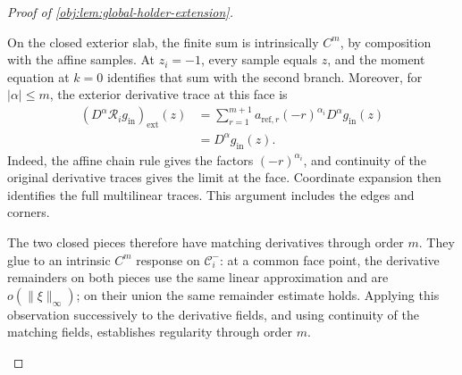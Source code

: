 \documentclass[11pt]{article}
\begin{document}
\begin{proof}[Proof of \cref{obj:lem:global-holder-extension}]
\begin{enumerate}
On the closed exterior slab, the finite sum is intrinsically \(C^m\), by composition with the affine samples. At \(z_i=-1\), every sample equals \(z\), and the moment equation at \(k=0\) identifies that sum with the second branch. Moreover, for \(|\alpha|\le m\), the exterior derivative trace at this face is
\[
\begin{aligned}
(D^\alpha\mathscr R_i g_{\mathrm{in}})_{\mathrm{ext}}(z)
&=
\sum_{r=1}^{m+1}
a_{\mathrm{ref},r}(-r)^{\alpha_i}D^\alpha g_{\mathrm{in}}(z)\\
&=D^\alpha g_{\mathrm{in}}(z).
\end{aligned}
\]
Indeed, the affine chain rule gives the factors \((-r)^{\alpha_i}\), and continuity of the original derivative traces gives the limit at the face. Coordinate expansion then identifies the full multilinear traces. This argument includes the edges and corners.

The two closed pieces therefore have matching derivatives through order \(m\). They glue to an intrinsic \(C^m\) response on \(\mathcal C_i^-\): at a common face point, the derivative remainders on both pieces use the same linear approximation and are \(o(\|\xi\|_\infty)\); on their union the same remainder estimate holds. Applying this observation successively to the derivative fields, and using continuity of the matching fields, establishes regularity through order \(m\).


\end{enumerate}
\end{proof}
\end{document}
